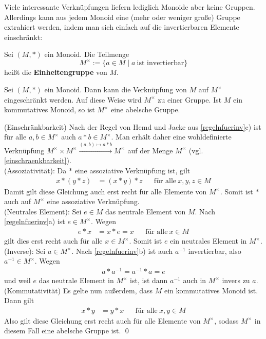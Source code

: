 \noindent Viele interessante Verknüpfungen liefern lediglich Monoide aber keine Gruppen. Allerdings kann aus jedem Monoid eine (mehr oder weniger große) Gruppe extrahiert werden, indem man sich einfach auf die invertierbaren Elemente einschränkt:


\begin{defin} 
    Sei $(M,*)$ ein Monoid. Die Teilmenge
        \[ M^\times := \{a\in M\mid a\ \text{ist invertierbar} \} \]
    heißt die \textbf{Einheitengruppe} von $M$.
\end{defin}


\begin{satz} \label{einheitengruppe}
    Sei $(M,*)$ ein Monoid. Dann kann die Verknüpfung von $M$ auf $M^\times$ eingeschränkt werden. Auf diese Weise wird $M^\times$ zu einer Gruppe. Ist $M$ ein kommutatives Monoid, so ist $M^\times$ eine abelsche Gruppe.
\end{satz}


\begin{bew}
    (Einschränkbarkeit) Nach der Regel von Hemd und Jacke aus \cref{regelnfuerinv}c) ist für alle $a,b\in M^\times$ auch $a*b\in M^\times$. Man erhält daher eine wohldefinierte Verknüpfung $M^\times\times M^\times \xrightarrow{(a,b)\mapsto a*b} M^\times$ auf der Menge $M^\times$ (vgl. \cref{einschraenkbarkeit}). \\[0.5em]
    (Assoziativität): Da $*$ eine assoziative Verknüpfung ist, gilt
    \begin{align*}
        x*(y*z) & = (x*y)*z && \text{für alle}\ x,y,z\in M
    \end{align*}
    Damit gilt diese Gleichung auch erst recht für alle Elemente von $M^\times$. Somit ist $*$ auch auf $M^\times$ eine assoziative Verknüpfung. \\[0.5em]
    (Neutrales Element): Sei $e\in M$ das neutrale Element von $M$. Nach \cref{regelnfuerinv}a) ist $e\in M^\times$. Wegen
    \begin{align*}
        e*x& =x*e=x && \text{für alle}\ x\in M
    \end{align*}
    gilt dies erst recht auch für alle $x\in M^\times$. Somit ist $e$ ein neutrales Element in $M^\times$. \\[0.5em]
    (Inverse): Sei $a\in M^\times$. Nach \cref{regelnfuerinv}b) ist auch $a^{-1}$ invertierbar, also $a^{-1}\in M^\times$. Wegen
    \begin{align*}
        a*a^{-1}=a^{-1}*a=e
    \end{align*}
    und weil $e$ das neutrale Element in $M^\times$ ist, ist dann $a^{-1}$ auch in $M^\times$ invers zu $a$. \\[0.5em]
    (Kommutativität) Es gelte nun außerdem, dass $M$ ein kommutatives Monoid ist. Dann gilt
    \begin{align*}
        x*y & = y*x && \text{für alle}\ x,y\in M
    \end{align*}
    Also gilt diese Gleichung erst recht auch für alle Elemente von $M^\times$, sodass $M^\times$ in diesem Fall eine abelsche Gruppe ist. \qed
\end{bew}


